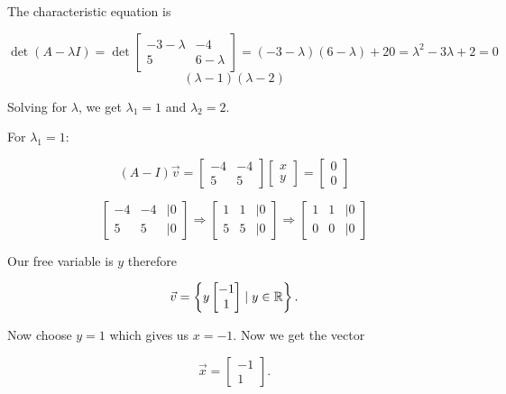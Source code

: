 The characteristic equation is

\[
    \det(A - \lambda I) 
    = \det 
    \begin{bmatrix}
            -3 - \lambda & -4 \\
        5 & 6 - \lambda
    \end{bmatrix} 
    = (-3 - \lambda)(6 - \lambda) + 20 = \lambda^2 - 3\lambda + 2 = 0    
\]
\[
    (\lambda - 1)(\lambda - 2)
\]

Solving for \(\lambda\), we get \(\lambda_1 = 1\) and \(\lambda_2 = 2\).

For \(\lambda_1 = 1\):

\[
   (A - I)\vec{v} = \begin{bmatrix}
    -4 & -4 \\
    5 & 5
    \end{bmatrix} \begin{bmatrix}
    x \\
    y
    \end{bmatrix} = \begin{bmatrix}
    0 \\
    0
    \end{bmatrix}
\]

\[
    \begin{bmatrix}
    -4 & -4 & \mid  0\\
    5 & 5   & \mid  0
    \end{bmatrix} 
    \Rightarrow
    \begin{bmatrix}
    1 & 1 & \mid  0\\
    5 & 5 & \mid  0
    \end{bmatrix}
    \Rightarrow
    \begin{bmatrix}
    1 & 1 & \mid  0\\
    0 & 0   & \mid  0
    \end{bmatrix}
\]    

Our free variable is \(y\) therefore 

\[
    \vec{v} = \left\{ y \begin{bmatrix} -1 \\ 1\end{bmatrix} \mid  y \in \mathbb{R} \right\}.
\]

Now choose \(y = 1\) which gives us \(x = -1\). Now we get the vector 

\[
    \vec{x} = \begin{bmatrix}
        -1 \\ 1
    \end{bmatrix}.
\]

